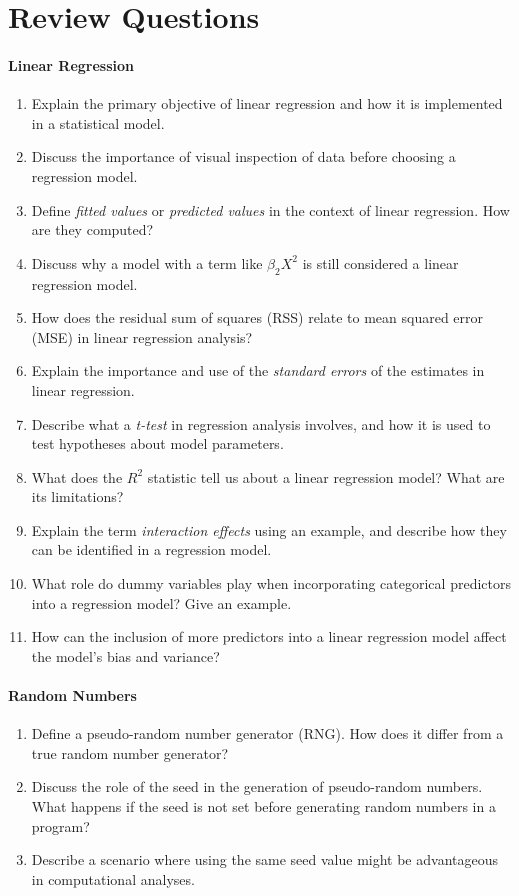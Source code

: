 \section{Review Questions}

\paragraph*{Linear Regression}
\begin{enumerate}[nosep]
  \item Explain the primary objective of linear regression and how it is implemented in a statistical model.
  \item Discuss the importance of visual inspection of data before choosing a regression model.
  \item Define \emph{fitted values} or \emph{predicted values} in the context of linear regression. How are they computed?
  \item Discuss why a model with a term like $\beta_2 X^2$ is still considered a linear regression model.
  \item How does the residual sum of squares (RSS) relate to mean squared error (MSE) in linear regression analysis?
  \item Explain the importance and use of the \emph{standard errors} of the estimates in linear regression.
  \item Describe what a \emph{t-test} in regression analysis involves, and how it is used to test hypotheses about model parameters.
  \item What does the $R^2$ statistic tell us about a linear regression model? What are its limitations?
  \item Explain the term \emph{interaction effects} using an example, and describe how they can be identified in a regression model.
  \item What role do dummy variables play when incorporating categorical predictors into a regression model? Give an example.
  \item How can the inclusion of more predictors into a linear regression model affect the model's bias and variance?
\end{enumerate}
\paragraph*{Random Numbers}
\begin{enumerate}
  \item Define a pseudo-random number generator (RNG). How does it differ from a true random number generator?
  \item Discuss the role of the seed in the generation of pseudo-random numbers. What happens if the seed is not set before generating random numbers in a program?
  \item Describe a scenario where using the same seed value might be advantageous in computational analyses.
\end{enumerate}
